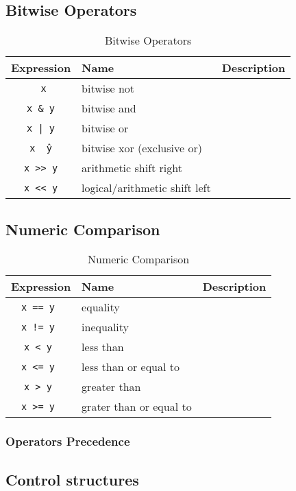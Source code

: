 \subsection{Bitwise Operators}

\begin{table}[H]
\begin{tabular}{ c l l }
	\toprule
	{\bf Expression} & {\bf Name}  & {\bf Description} \\
	\midrule 
	{\tt ~x} & bitwise not & \\
	{\tt x \& y} & bitwise and &  \\
	{\tt x | y} & bitwise or &  \\
	{\tt x \^\ y} & bitwise xor (exclusive or) &  \\
	{\tt x >> y} & arithmetic shift right &  \\
	{\tt x << y} & logical/arithmetic shift left&  \\
	\bottomrule
\end{tabular}
\centering
\caption{Bitwise Operators}
\label{tab:bitwise-operators}
\end{table} 

\subsection{Numeric Comparison}

\begin{table}[H]
\begin{tabular}{ c l l }
	\toprule
	{\bf Expression} & {\bf Name}  & {\bf Description} \\
	\midrule 
	{\tt x == y } & equality & \\
	{\tt x != y } & inequality &  \\
	{\tt x < y } & less than &  \\
	{\tt x <= y } & less than or equal to &  \\
	{\tt x > y } & greater than &  \\
	{\tt x >= y } & grater than or equal to &  \\
	\bottomrule
\end{tabular}
\centering
\caption{Numeric Comparison}
\label{tab:numeric-comp}
\end{table} 

\subsubsection{Operators Precedence}

\subsection{Control structures}

